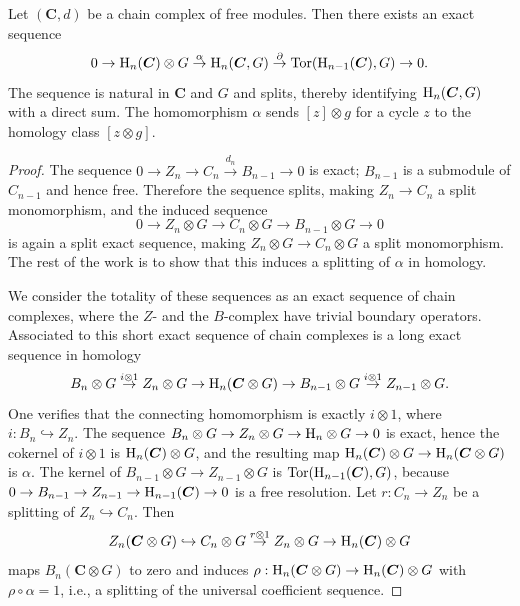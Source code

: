 \begin{prop}\label{prop 11.9.1 tomDieck}
    Let $(\bm{C},d)$ be a chain complex of free modules. Then there exists an exact sequence
    \[0\to \mathrm{H}_n(\boldsymbol{C})\otimes G\overset{\alpha}{\to}\mathrm{H}_n(\boldsymbol{C}, G)\overset{\partial}{\to}\operatorname{Tor}(\mathrm{H}_{n-1}(\boldsymbol{C}),G)\to 0.\]
    The sequence is natural in $\bm{C}$ and $G$ and splits, thereby identifying $\mathrm{H}_n(\boldsymbol{C},G)$ with a direct sum. The homomorphism $\alpha$ sends $[z]\otimes g$ for a cycle $z$ to the homology class $[z\otimes g]$.
\end{prop}
\begin{proof}
    The sequence $0\to Z_n\to C_n\overset{d_n}{\to}B_{n-1}\to 0$ is exact; $B_{n-1}$ is a submodule of $C_{n-1}$ and hence free. Therefore the sequence splits, making $Z_n\to C_n$ a split monomorphism, and the induced sequence
    \[0\to Z_n\otimes G\to C_n\otimes G\to B_{n-1}\otimes G\to 0\]
    is again a split exact sequence, making $Z_n\otimes G\to C_n\otimes G$ a split monomorphism. The rest of the work is to show that this induces a splitting of $\alpha$ in homology.
    
    We consider the totality of these sequences as an exact sequence of chain complexes, where the $Z$- and the $B$-complex have trivial boundary operators. Associated to this short exact sequence of chain complexes is a long exact sequence in homology
    \[B_n\otimes G\overset{i\otimes 1}{\to} Z_n\otimes G\to \mathrm{H}_n(\boldsymbol{C}\otimes G)\to B_{n-1}\otimes G\overset{i\otimes 1}{\to }Z_{n-1}\otimes G.\]
    One verifies that the connecting homomorphism is exactly $i\otimes 1$, where $i:B_n\hookrightarrow Z_n$. The sequence $B_n\otimes G\to Z_n\otimes G\to \mathrm{H}_n\otimes G\to 0$ is exact, hence the cokernel of $i\otimes 1$ is $\mathrm{H}_n(\boldsymbol{C})\otimes G$, and the resulting map $\mathrm{H}_n(\boldsymbol{C})\otimes G\to \mathrm{H}_n(\boldsymbol{C}\otimes G)$ is $\alpha$. The kernel of $B_{n-1}\otimes G\to Z_{n-1}\otimes G$ is $\operatorname{Tor}(\mathrm{H}_{n-1}(\boldsymbol{C}),G)$, because $0\to B_{n-1}\to Z_{n-1}\to \mathrm{H}_{n-1}(\boldsymbol{C})\to 0$ is a free resolution. Let $r:C_n\to Z_n$ be a splitting of $Z_n\hookrightarrow C_n$. Then
    \[Z_n(\boldsymbol{C}\otimes G)\hookrightarrow C_n\otimes G\overset{r\otimes 1}{\to}Z_n\otimes G\to \mathrm{H}_n(\boldsymbol{C})\otimes G\]
    maps $B_n(\bm{C}\otimes G)$ to zero and induces $\rho:\mathrm{H}_n(\boldsymbol{C}\otimes G)\to \mathrm{H}_n(\boldsymbol{C})\otimes G$ with $\rho\circ\alpha=1$, i.e., a splitting of the universal coefficient sequence.
\end{proof}


